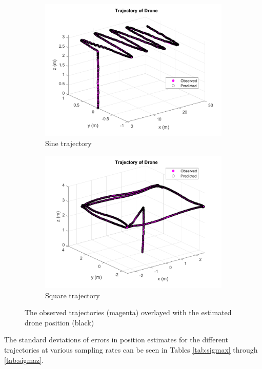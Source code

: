 \documentclass[letterpaper, paper,11pt]{AAS}	%
\begin{document}
\begin{figure}[H]
\begin{subfigure}{.5\textwidth}
	\includegraphics[width=\textwidth]{../sine1_traj}
	\caption{Sine trajectory}
	\label{fig:sine1_traj}
\end{subfigure}%
\begin{subfigure}{.5\textwidth}
	\centering
	\includegraphics[width=\textwidth]{../square1_traj}
	\caption{Square trajectory}
	\label{fig:square1_traj}
\end{subfigure}
\caption{The observed trajectories (magenta) overlayed with the estimated drone position (black)}
\label{fig:Overal}
\end{figure}

The standard deviations of errors in position estimates for the different trajectories at various sampling rates can be seen in Tables \ref{tab:sigmax} through \ref{tab:sigmaz}.
\end{document}
